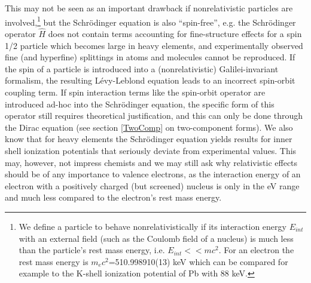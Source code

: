 \documentclass[12pt]{article}
\begin{document}
This may not be seen as an important drawback if nonrelativistic particles are involved,\footnote{We define a particle to behave nonrelativistically if its interaction energy $E_{int}$ with an external field (such as the Coulomb field of a nucleus) is much less than the particle's rest mass energy, i.e. $E_{int}<<mc^2$. For an electron the rest mass energy is $m_ec^2$=510.998910(13) keV which can be compared for example to the K-shell ionization potential of Pb with 88 keV.} but the Schr\"odinger equation is also ``spin-free'', e.g. the Schr\"odinger operator $\hat{H}$ does not contain terms accounting for fine-structure effects for a spin 1/2 particle which becomes large in heavy elements, and experimentally observed fine (and hyperfine) splittings in atoms and molecules cannot be reproduced. If the spin of a particle is introduced into a (nonrelativistic) Galilei-invariant formalism, the resulting L\'evy-Leblond equation leads to an incorrect spin-orbit coupling term.\cite{levy-leblond-1967} If spin interaction terms like the spin-orbit operator are introduced ad-hoc into the Schr{\"o}dinger equation, the specific form of this operator still requires theoretical justification, and this can only be done through the Dirac equation (see section \ref{TwoComp} on two-component forms). 
We also know that for heavy elements the Schr{\"o}dinger equation yields results for inner shell ionization potentials that seriously deviate from experimental values. This may, however, not impress chemists and we may still ask why relativistic effects should be of any importance to valence electrons, as the interaction energy of an electron with a positively charged (but screened) nucleus is only in the eV range and much less compared to the electron's rest mass energy.
\end{document}
